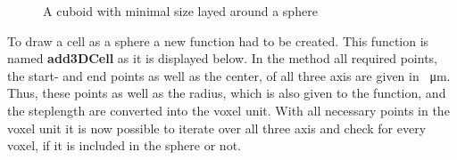 \begin{figure}
\begin{center}
\caption{A cuboid with minimal size layed around a sphere}
\label{tikz:CuboidSphere}
\end{center}
\end{figure}

To draw a cell as a sphere a new function had to be created. This function is named \textbf{add3DCell} as it is displayed below. In the method all required points, the start- and end points as well as the center, of all three axis are given in \SI{}{\micro\metre}. Thus, these points as well as the radius, which is also given to the function, and the steplength are converted into the voxel unit. \newline
With all necessary points in the voxel unit it is now possible to iterate over all three axis and check for every voxel, if it is included in the sphere or not.



